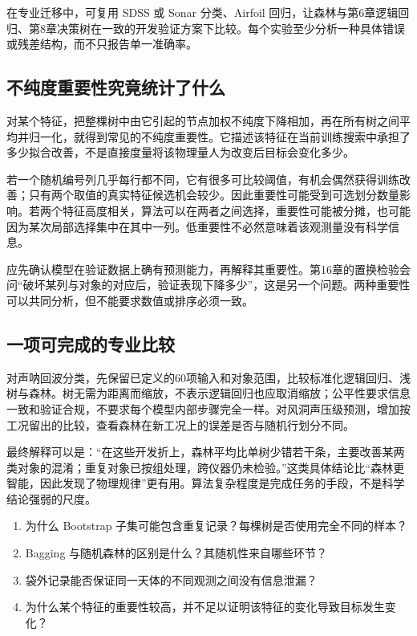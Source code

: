 
在专业迁移中，可复用 SDSS 或 Sonar 分类、Airfoil 回归，让森林与第6章逻辑回归、第8章决策树在一致的开发验证方案下比较。每个实验至少分析一种具体错误或残差结构，而不只报告单一准确率。

\subsection{不纯度重要性究竟统计了什么}
对某个特征，把整棵树中由它引起的节点加权不纯度下降相加，再在所有树之间平均并归一化，就得到常见的不纯度重要性。它描述该特征在当前训练搜索中承担了多少拟合改善，不是直接度量将该物理量人为改变后目标会变化多少。

若一个随机编号列几乎每行都不同，它有很多可比较阈值，有机会偶然获得训练改善；只有两个取值的真实特征候选机会较少。因此重要性可能受到可选划分数量影响。若两个特征高度相关，算法可以在两者之间选择，重要性可能被分摊，也可能因为某次局部选择集中在其中一列。低重要性不必然意味着该观测量没有科学信息。

应先确认模型在验证数据上确有预测能力，再解释其重要性。第16章的置换检验会问“破坏某列与对象的对应后，验证表现下降多少”，这是另一个问题。两种重要性可以共同分析，但不能要求数值或排序必须一致。

\subsection{一项可完成的专业比较}
对声呐回波分类，先保留已定义的60项输入和对象范围，比较标准化逻辑回归、浅树与森林。树无需为距离而缩放，不表示逻辑回归也应取消缩放；公平性要求信息一致和验证合规，不要求每个模型内部步骤完全一样。对风洞声压级预测，增加按工况留出的比较，查看森林在新工况上的误差是否与随机行划分不同。

最终解释可以是：“在这些开发折上，森林平均比单树少错若干条，主要改善某两类对象的混淆；重复对象已按组处理，跨仪器仍未检验。”这类具体结论比“森林更智能，因此发现了物理规律”更有用。算法复杂程度是完成任务的手段，不是科学结论强弱的尺度。

\chapterexercise
\begin{enumerate}
\item 为什么 Bootstrap 子集可能包含重复记录？每棵树是否使用完全不同的样本？
\item Bagging 与随机森林的区别是什么？其随机性来自哪些环节？
\item 袋外记录能否保证同一天体的不同观测之间没有信息泄漏？
\item 为什么某个特征的重要性较高，并不足以证明该特征的变化导致目标发生变化？
\end{enumerate}

